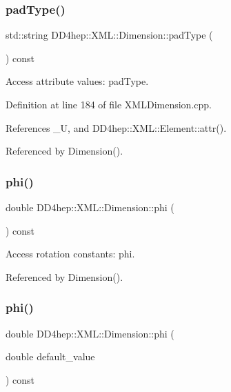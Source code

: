 \subsubsection{\texorpdfstring{pad\+Type()}{padType()}}
{\footnotesize\ttfamily std\+::string D\+D4hep\+::\+X\+M\+L\+::\+Dimension\+::pad\+Type (\begin{DoxyParamCaption}{ }\end{DoxyParamCaption}) const}



Access attribute values\+: pad\+Type. 



Definition at line 184 of file X\+M\+L\+Dimension.\+cpp.



References \+\_\+U, and D\+D4hep\+::\+X\+M\+L\+::\+Element\+::attr().



Referenced by Dimension().

\hypertarget{struct_d_d4hep_1_1_x_m_l_1_1_dimension_a60adab36dd6958f9602ad3d9e8aa75bc}{}\label{struct_d_d4hep_1_1_x_m_l_1_1_dimension_a60adab36dd6958f9602ad3d9e8aa75bc} 
\subsubsection{\texorpdfstring{phi()}{phi()}\hspace{0.1cm}{\footnotesize\ttfamily [1/2]}}
{\footnotesize\ttfamily double D\+D4hep\+::\+X\+M\+L\+::\+Dimension\+::phi (\begin{DoxyParamCaption}{ }\end{DoxyParamCaption}) const}



Access rotation constants\+: phi. 



Referenced by Dimension().

\hypertarget{struct_d_d4hep_1_1_x_m_l_1_1_dimension_a2d6b45fde139dcafc95ffe8b579aa807}{}\label{struct_d_d4hep_1_1_x_m_l_1_1_dimension_a2d6b45fde139dcafc95ffe8b579aa807} 
\subsubsection{\texorpdfstring{phi()}{phi()}\hspace{0.1cm}{\footnotesize\ttfamily [2/2]}}
{\footnotesize\ttfamily double D\+D4hep\+::\+X\+M\+L\+::\+Dimension\+::phi (\begin{DoxyParamCaption}\item[{double}]{default\+\_\+value }\end{DoxyParamCaption}) const}



